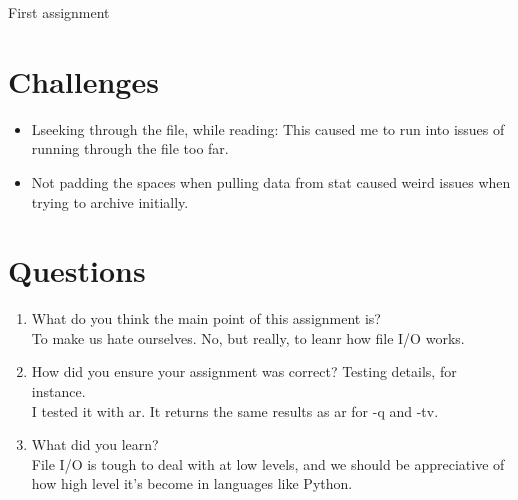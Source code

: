 \documentclass[fleqn,10pt,titlepage]{article}
\begin{document}
    First assignment
\clearpage

\section{Challenges}
\begin{itemize}
\item Lseeking through the file, while reading: This caused me to run into issues of running through the file too far.
\item Not padding the spaces when pulling data from stat caused weird issues when trying to archive initially.
\end{itemize}
\clearpage

\section{Questions}
\begin{enumerate}
\item What do you think the main point of this assignment is? \\ To make us hate ourselves. No, but really, to leanr how file I/O works.
\item How did you ensure your assignment was correct? Testing details, for instance. \\ I tested it with ar. It returns the same results as ar for -q and -tv.
\item What did you learn? \\ File I/O is tough to deal with at low levels, and we should be appreciative of how high level it's become in languages like Python.
\end{enumerate}
\end{document}
